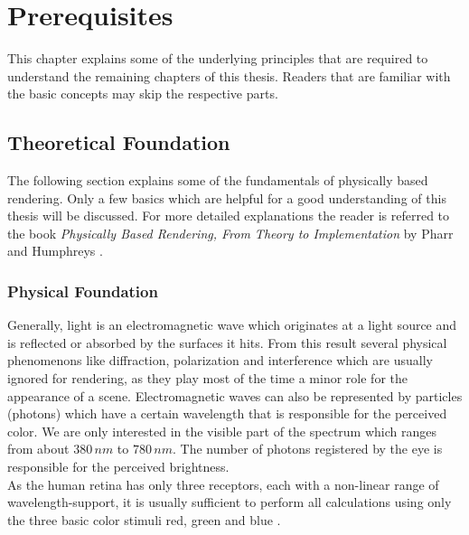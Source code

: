 \documentclass[thesis.tex]{subfiles}
\begin{document}
\chapter{Prerequisites}\label{chap:preq}
This chapter explains some of the underlying principles that are required to understand the remaining chapters of this thesis.
Readers that are familiar with the basic concepts may skip the respective parts.


\section{Theoretical Foundation} \label{sec:preq:theo}
The following section explains some of the fundamentals of physically based rendering.
Only a few basics which are helpful for a good understanding of this thesis will be discussed.
For more detailed explanations the reader is referred to the book \emph{Physically Based Rendering, From Theory to Implementation} by Pharr and Humphreys \cite{bib:pbrt}.

\subsection{Physical Foundation}
Generally, light is an electromagnetic wave which originates at a light source and is reflected or absorbed by the surfaces it hits.
From this result several physical phenomenons like diffraction, polarization and interference which are usually ignored for rendering, as they play most of the time a minor role for the appearance of a scene.
Electromagnetic waves can also be represented by particles (photons) which have a certain wavelength that is responsible for the perceived color.
We are only interested in the visible part of the spectrum which ranges from about $380\,nm$ to $780\,nm$.
The number of photons registered by the eye is responsible for the perceived brightness.
\\
As the human retina has only three receptors, each with a non-linear range of wavelength-support, it is usually sufficient to perform all calculations using only the three basic color stimuli red, green and blue \cite{bib:colorscience}.
\end{document}
